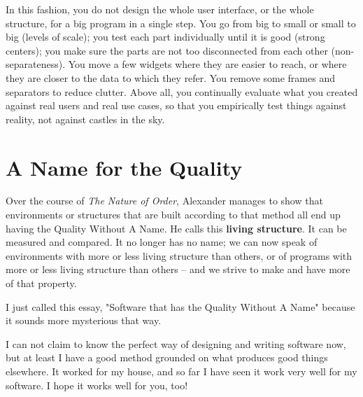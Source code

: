 In this fashion, you do not design the whole user interface, or the whole
structure, for a big program in a single step. You go from big to small or small
to big (levels of scale); you test each part individually until it is good
(strong centers); you make sure the parts are not too disconnected from each
other (non-separateness). You move a few widgets where they are easier to reach,
or where they are closer to the data to which they refer. You remove some frames
and separators to reduce clutter. Above all, you continually evaluate what you
created against real users and real use cases, so that you empirically test
things against reality, not against castles in the sky.

\section*{A Name for the Quality}

Over the course of \textit{The Nature of Order}, Alexander manages to show that
environments or structures that are built according to that method all end up
having the Quality Without A Name. He calls this \textbf{living structure}. It
can be measured and compared. It no longer has no name; we can now speak of
environments with more or less living structure than others, or of programs with
more or less living structure than others -- and we strive to make and have more of
that property.

I just called this essay, "Software that has the Quality Without A Name" because
it sounds more mysterious that way.

I can not claim to know the perfect way of designing and writing software now,
but at least I have a good method grounded on what produces good things
elsewhere. It worked for my house, and so far I have seen it work very well for
my software. I hope it works well for you, too!


